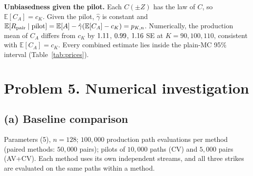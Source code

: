 \documentclass[10pt]{article}
\newcommand{\E}{\mathbb{E}}
\newcommand{\R}{../results}
\begin{document}
\textbf{Unbiasedness given the pilot.} Each $C(\pm Z)$ has the law of $C$, so $\E[C_A]=c_K$. Given
the pilot, $\hat\gamma$ is constant and $\E[R_{\rm pair}\mid\text{pilot}]=\E[A]-\hat\gamma(\E[C_A]-c_K)=p_{K,n}$.
Numerically, the production mean of $C_A$ differs from $c_K$ by $1.11$, $0.99$, $1.16$ SE at
$K=90,100,110$, consistent with $\E[C_A]=c_K$. Every combined estimate lies inside the
plain-MC 95\% interval (Table~\ref{tab:prices}).

\section*{Problem 5. Numerical investigation}

\subsection*{(a) Baseline comparison}
Parameters (5), $n=128$; $100{,}000$ production path evaluations per method (paired methods: $50{,}000$
pairs); pilots of $10{,}000$ paths (CV) and $5{,}000$ pairs (AV+CV). Each method uses its own
independent streams, and all three strikes are evaluated on the same paths within a method.
\begin{table}[H]\centering\small

\caption{Estimates, SE and 95\% intervals from (18); $m$ = production observations (paths or pairs).}\label{tab:prices}
\end{table}
\begin{table}[H]\centering\small

\caption{Computation time per method, shared by all three strikes (counted once). Pilot and production
times are medians of 5 repeated runs with identical seeds (identical estimates); the last column is the
range of the 5 totals. Timing follows the protocol: it includes RNG, simulation, control evaluation,
coefficient estimation and production statistics, and excludes plotting, file output and a one-time warm-up.}\label{tab:time}
\end{table}
\begin{table}[H]\centering\small

\caption{Fitted coefficients ($\hat\beta$ for CV, $\hat\gamma$ for AV+CV, from the pilot), production-sample
correlations, VRF and Gain from (19) using the total times of Table~\ref{tab:time}.
VRF$_{\rm pred}$ is the large-sample value implied by the correlations: $1/(1-\rho_{X,C}^2)$,
$1/(1+\rho_{X^+,X^-})$, $1/[(1+\rho_{X^+,X^-})(1-\rho_{A,C_A}^2)]$.}\label{tab:eff}
\end{table}
\end{document}
